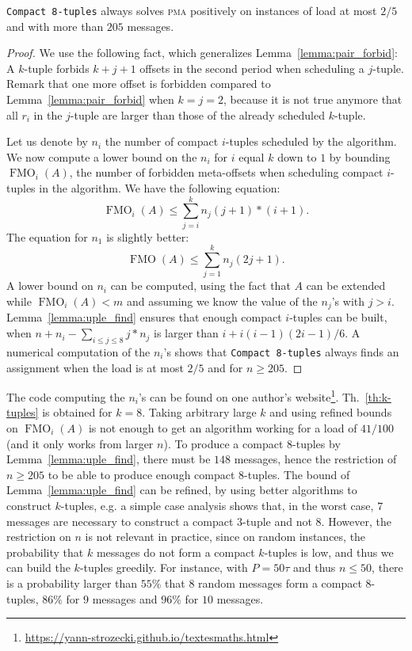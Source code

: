 \documentclass[a4paper,UKenglish,cleveref, autoref, thm-restate]{lipics-v2019}
\DeclareMathOperator{\Fmo}{FMO}
\newcommand\pma{\textsc{pma}\xspace}
\begin{document}
\begin{theorem}\label{th:k-tuples}
\texttt{Compact 8-tuples} always solves \pma positively on instances of load at most $2/5$ and with more than $205$ messages.
\end{theorem}
\begin{proof}
We use the following fact, which generalizes Lemma~\ref{lemma:pair_forbid}: A $k$-tuple forbids $k+j+1$ offsets in the second period when scheduling a $j$-tuple. Remark that one more offset is forbidden compared to Lemma~\ref{lemma:pair_forbid} when $k = j = 2$, because it is not true anymore that all
$r_i$ in the $j$-tuple are larger than those of the already scheduled $k$-tuple.

Let us denote by $n_i$ the number of compact $i$-tuples scheduled by the algorithm. We now compute a lower bound on the $n_i$ for $i$ equal $k$ down to $1$ by bounding $\Fmo_i(A)$, the number of forbidden meta-offsets when scheduling compact $i$-tuples in the algorithm. 
We have the following equation:  $$ \Fmo_i(A) \leq \displaystyle{\sum_{j=i}^k n_j(j+1)*(i+1)}.$$
The equation for $n_1$ is slightly better: 
$$ \Fmo(A) \leq \displaystyle{\sum_{j=1}^k n_j(2j + 1)}.$$
A lower bound on $n_i$ can be computed, using the fact that $A$ can be extended while $\Fmo_i(A) < m$ and assuming we know the value of the $n_j$'s with $j > i$. 
Lemma~\ref{lemma:uple_find} ensures that enough compact $i$-tuples can be built, when $n + n_i - \sum_{i \leq j \leq 8} j*n_j$ is larger than $i + i(i-1)(2i-1)/6$. 
A numerical computation of the $n_i$'s shows that \texttt{Compact 8-tuples} always finds an assignment when the load is at most $2/5$ and for $n \geq 205$.
\end{proof}

The code computing the $n_i$'s can be found on one author's website\footnote{\url{https://yann-strozecki.github.io/textesmaths.html}}. Th.~\ref{th:k-tuples} is obtained for $k=8$. Taking arbitrary large $k$ and using refined bounds on $\Fmo_i(A)$ is not enough to get an algorithm working for a load of $41/100$ (and it only works from larger $n$). To produce a compact $8$-tuples by Lemma~\ref{lemma:uple_find}, there must be $148$ messages, hence the restriction of $n \geq 205$ to be able to produce enough compact $8$-tuples.
The bound of Lemma~\ref{lemma:uple_find} can be refined, by using better algorithms to construct $k$-tuples, e.g. a simple case analysis shows that, in the worst case, $7$ messages are necessary to construct a compact $3$-tuple and not $8$. However, the restriction on $n$ is not relevant in practice, since on random instances, the probability that $k$ messages do not form a compact $k$-tuples is low, and thus we can build the $k$-tuples greedily. For instance, with $P=50\tau$ and thus $n \leq 50$, there is a probability larger than $55\%$ that $8$ random messages form a compact $8$-tuples, $86\%$ for $9$ messages and $96\%$ for $10$ messages.
\end{document}
